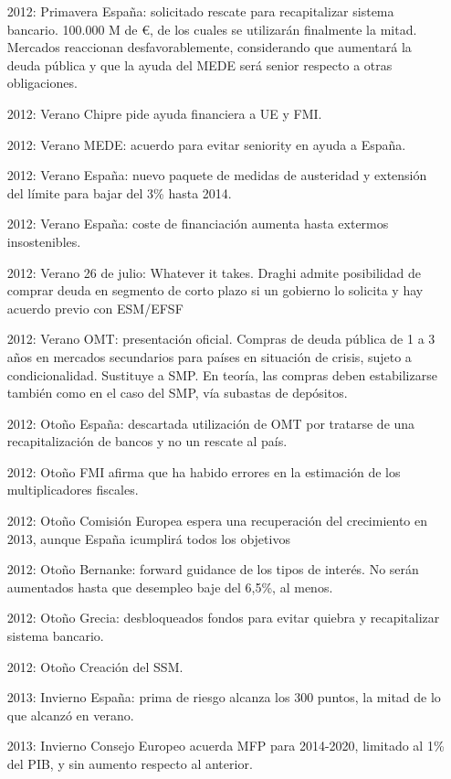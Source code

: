 \documentclass{nuevotema}
\begin{document}
\begin{itemize}
	\item[2012: Primavera] España: solicitado rescate para recapitalizar sistema bancario. 100.000 M de €, de los cuales se utilizarán finalmente la mitad. Mercados reaccionan desfavorablemente, considerando que aumentará la deuda pública y que la ayuda del MEDE será senior respecto a otras obligaciones.
	\item[2012: Verano] Chipre pide ayuda financiera a UE y FMI.
	\item[2012: Verano] MEDE: acuerdo para evitar seniority en ayuda a España.
	\item[2012: Verano] España: nuevo paquete de medidas de austeridad y extensión del límite para bajar del 3\% hasta 2014.
	\item[2012: Verano] España: coste de financiación aumenta hasta extermos insostenibles.
	\item[2012: Verano] 26 de julio: Whatever it takes. Draghi admite posibilidad de comprar deuda en segmento de corto plazo si un gobierno lo solicita y hay acuerdo previo con ESM/EFSF
	\item[2012: Verano] OMT: presentación oficial. Compras de deuda pública de 1 a 3 años en mercados secundarios para países en situación de crisis, sujeto a condicionalidad. Sustituye a SMP. En teoría, las compras deben estabilizarse también como en el caso del SMP, vía subastas de depósitos.
	\item[2012: Otoño] España: descartada utilización de OMT por tratarse de una recapitalización de bancos y no un rescate al país. 
	\item[2012: Otoño] FMI afirma que ha habido errores en la estimación de los multiplicadores fiscales.
	\item[2012: Otoño] Comisión Europea espera una recuperación del crecimiento en 2013, aunque España icumplirá todos los objetivos
	\item[2012: Otoño] Bernanke: forward guidance de los tipos de interés. No serán aumentados hasta que desempleo baje del 6,5\%, al menos.
	\item[2012: Otoño] Grecia: desbloqueados fondos para evitar quiebra y recapitalizar sistema bancario.
	\item[2012: Otoño] Creación del SSM.
	\item[2013: Invierno] España: prima de riesgo alcanza los 300 puntos, la mitad de lo que alcanzó en verano.
	\item[2013: Invierno] Consejo Europeo acuerda MFP para 2014-2020, limitado al 1\% del PIB, y sin aumento respecto al anterior. 

\end{itemize}
\end{document}
